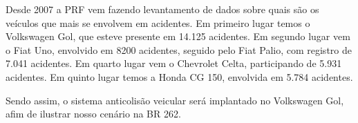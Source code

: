 Desde 2007 a PRF vem fazendo levantamento de dados sobre quais são os veículos
que mais se envolvem em acidentes. Em primeiro lugar temos o Volkswagen Gol, que
esteve presente em 14.125 acidentes. Em segundo lugar vem o Fiat Uno, envolvido
em 8200 acidentes, seguido pelo Fiat Palio, com registro de 7.041 acidentes. Em
quarto lugar vem o Chevrolet Celta, participando de 5.931 acidentes. Em quinto
lugar temos a Honda CG 150, envolvida em 5.784 acidentes.

Sendo assim, o sistema anticolisão veicular será implantado no Volkswagen Gol,
afim de ilustrar nosso cenário na BR 262.
